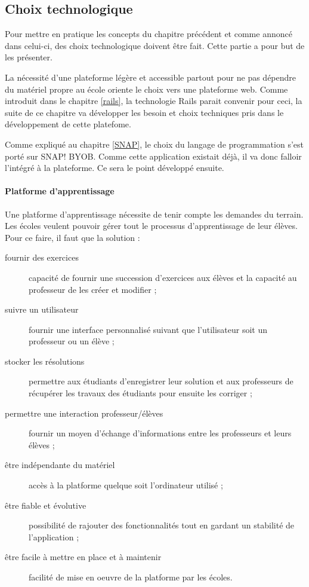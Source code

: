 \subsection{Choix technologique}
Pour mettre en pratique les concepts du chapitre précédent et comme annoncé dans celui-ci, des choix technologique doivent être fait. Cette partie a pour but de les présenter. 

La nécessité d'une plateforme légère et accessible partout pour ne pas dépendre du matériel propre au école oriente le choix vers une plateforme web. Comme introduit dans le chapitre \ref{rails}, la technologie Rails parait convenir pour ceci, la suite de ce chapitre va développer les besoin et choix techniques pris dans le développement de cette platefome. 

Comme expliqué au chapitre \ref{SNAP}, le choix du langage de programmation s'est porté sur SNAP! BYOB. Comme cette application existait déjà, il va donc falloir l'intégré à la plateforme. Ce sera le point développé ensuite.

\paragraph{Platforme d'apprentissage}
Une platforme d'apprentissage nécessite de tenir compte les demandes du terrain. Les écoles veulent pouvoir gérer tout le processus d'apprentissage de leur élèves. Pour ce faire, il faut que la solution :
\begin{description}
  \item[fournir des exercices] capacité de fournir une succession d'exercices aux élèves et la capacité au professeur de les créer et modifier ;
  \item[suivre un utilisateur] fournir une interface personnalisé suivant que l'utilisateur soit un professeur ou un élève ;
  \item[stocker les résolutions] permettre aux étudiants d'enregistrer leur solution et aux professeurs de récupérer les travaux des étudiants pour ensuite les corriger ;
  \item[permettre une interaction professeur/élèves] fournir un moyen d'échange d'informations entre les professeurs et leurs élèves ;
  \item[être indépendante du matériel] accès à la platforme quelque soit l'ordinateur utilisé ;
  \item[être fiable et évolutive] possibilité de rajouter des fonctionnalités tout en gardant un stabilité de l'application ;
  \item[être facile à mettre en place et à maintenir] facilité de mise en oeuvre de la platforme par les écoles.
\end{description}

